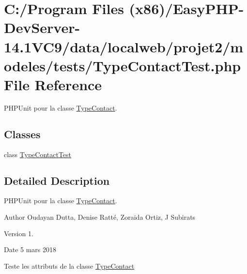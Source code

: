 \hypertarget{_type_contact_test_8php}{}\section{C\+:/\+Program Files (x86)/\+Easy\+P\+H\+P-\/\+Dev\+Server-\/14.1\+V\+C9/data/localweb/projet2/modeles/tests/\+Type\+Contact\+Test.php File Reference}
\label{_type_contact_test_8php}


P\+H\+P\+Unit pour la classe \hyperlink{class_type_contact}{Type\+Contact}.  


\subsection*{Classes}
\begin{DoxyCompactItemize}
\item 
class \hyperlink{class_type_contact_test}{Type\+Contact\+Test}
\end{DoxyCompactItemize}


\subsection{Detailed Description}
P\+H\+P\+Unit pour la classe \hyperlink{class_type_contact}{Type\+Contact}. 

\begin{DoxyAuthor}{Author}
Oudayan Dutta, Denise Ratté, Zoraida Ortiz, J Subirats 
\end{DoxyAuthor}
\begin{DoxyVersion}{Version}
1. 
\end{DoxyVersion}
\begin{DoxyDate}{Date}
5 mars 2018
\end{DoxyDate}
Teste les attributs de la classe \hyperlink{class_type_contact}{Type\+Contact} 